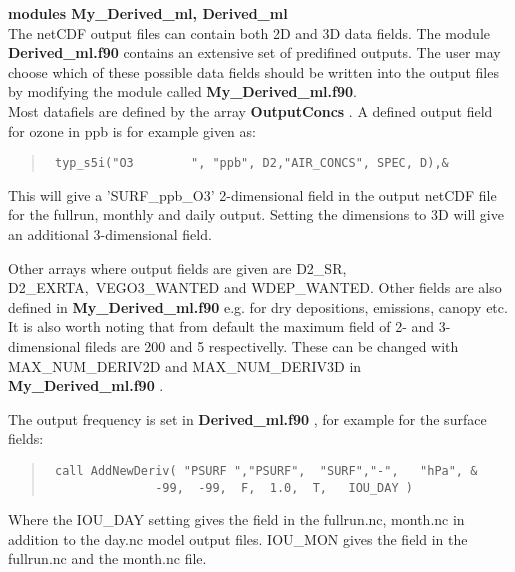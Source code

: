 {\bf modules My\_Derived\_ml, Derived\_ml }\\

% 

The netCDF output files can contain both 2D and 3D data fields. The module 
{ \bf Derived\_ml.f90 } contains an extensive set of predifined outputs. 
The user may choose which of these possible data fields should be written 
into the output files by modifying the module called { \bf My\_Derived\_ml.f90}.\\

Most datafiels are defined by the array {\bf OutputConcs }. A defined output 
field for ozone in ppb is for example given  as:
\begin{quote}
\begin{verbatim}
 typ_s5i("O3        ", "ppb", D2,"AIR_CONCS", SPEC, D),& 
\end{verbatim}
\end{quote}
This will give a 'SURF\_ppb\_O3' 2-dimensional field in the output netCDF file for 
the fullrun, monthly and daily output. 
Setting the dimensions to 3D will give an additional 3-dimensional field. 


Other arrays where output fields are given are D2\_SR, D2\_EXRTA,\
 VEGO3\_WANTED and 
WDEP\_WANTED. Other fields are also defined in { \bf My\_Derived\_ml.f90 } e.g. for dry 
depositions, emissions, canopy etc. \\



It is also worth noting that from default the maximum field of 2- and 3-dimensional fileds 
are 200 and 5 respectivelly. These can be changed with MAX\_NUM\_DERIV2D and MAX\_NUM\_DERIV3D 
in { \bf My\_Derived\_ml.f90 }.


The output frequency is set in { \bf Derived\_ml.f90 }, for example for the surface fields:
\begin{quote}
\begin{verbatim}
 call AddNewDeriv( "PSURF ","PSURF",  "SURF","-",   "hPa", &
               -99,  -99,  F,  1.0,  T,   IOU_DAY )
\end{verbatim}
\end{quote}
 Where the IOU\_DAY setting gives the field in the fullrun.nc, month.nc in addition to the day.nc 
model output files. IOU\_MON gives the field in the fullrun.nc and the month.nc file. 




